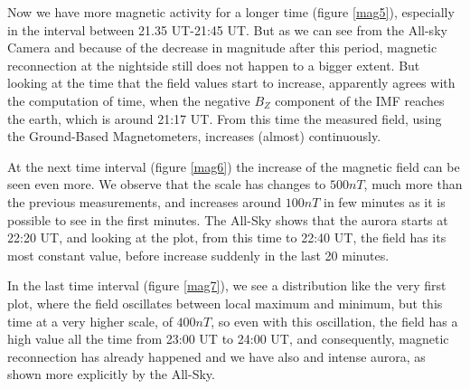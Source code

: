 \documentclass[10pt,a4paper]{article}
\begin{document}
Now we have more magnetic activity for a longer time (figure \ref{mag5}), especially in the interval between 21.35 UT-21:45 UT. But as we can see from the All-sky Camera and because of the decrease in magnitude after this period, magnetic reconnection at the nightside still does not happen to a bigger extent. But looking at the time that the field values start to increase, apparently agrees with the computation of time, when the negative $B_Z$ component of the IMF reaches the earth, which is around 21:17 UT. From this time the measured field, using the Ground-Based Magnetometers, increases (almost) continuously.

At the next time interval (figure \ref{mag6}) the increase of the magnetic field can be seen even more. We observe that the scale has changes to $500 nT$, much more than the previous measurements, and increases around $100 nT$ in few minutes as it is possible to see in the first minutes. The All-Sky shows that the aurora starts at 22:20 UT, and looking at the plot, from this time to 22:40 UT, the field has its most constant value, before increase suddenly in the last 20 minutes.

In the last time interval (figure \ref{mag7}), we see a distribution like the very first plot, where the field oscillates between local maximum and minimum, but this time at a very higher scale, of $400 nT$, so even with this oscillation, the field has a high value all the time from 23:00 UT to 24:00 UT, and consequently, magnetic reconnection has already happened and we have also and intense aurora, as shown more explicitly by the All-Sky.
\end{document}
